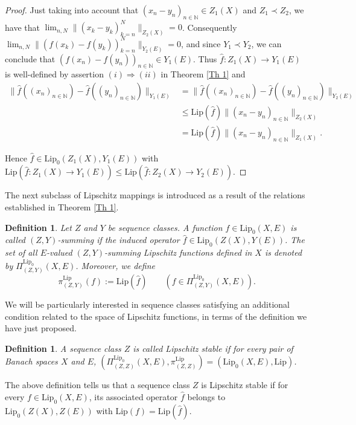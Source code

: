 \documentclass[12pt]{amsart}
\newtheorem{definition}[theorem]{Definition}
\def\N{\mathbb{N}}
\def\Lip{\mathrm{Lip}_0}
\def\Lipnorm{\mathrm{Lip}}
\begin{document}
\begin{proof}
	Just taking into account that $(x_n-y_n)_{n\in\N} \in Z_1(X)$ and $Z_1 \prec Z_2$, we have that $\lim_{n,N}\|(x_k-y_k)_{k=n}^N\|_{Z_2(X)} = 0$. Consequently $\lim_{n,N}\|(f(x_k)-f(y_k))_{k=n}^N\|_{Y_2(E)}=0$, and since $Y_1 \prec Y_2$, we can conclude that $(f(x_n)-f(y_n))_{n\in\N} \in Y_1(E)$. Thus $\hat{f}:Z_1(X)\to Y_1(E)$ is well-defined by assertion $(i) \Rightarrow (ii)$ in Theorem \ref{Th 1} and
	\begin{align*}
		\|\hat{f}((x_n)_{n\in\N})-\hat{f}((y_n)_{n\in\N})\|_{Y_1(E)} &= \|\hat{f}((x_n)_{n\in\N})-\hat{f}((y_n)_{n\in\N})\|_{Y_2(E)}\\
		&\leq \Lipnorm(\hat{f})\|(x_n-y_n)_{n\in\N}\|_{Z_2(X)}\\
		&= \Lipnorm(\hat{f})\|(x_n-y_n)_{n\in\N}\|_{Z_1(X)}.
	\end{align*}

	Hence $\hat{f} \in \Lip(Z_1(X),Y_1(E))$ with $\Lipnorm(\hat{f}:Z_1(X)\to Y_1(E)) \leq \Lipnorm(\hat{f}:Z_2(X)\to Y_2(E))$.
\end{proof}

The next subclass of Lipschitz mappings is introduced as a result of the relations established in Theorem \ref{Th 1}.

\begin{definition}\label{Def 3}
	Let $Z$ and $Y$ be sequence classes. A function $f\in\Lip(X,E)$ is called $(Z,Y)$-summing if the induced operator $\hat{f} \in \Lip(Z(X),Y(E))$. The set of all $E$-valued $(Z,Y)$-summing Lipschitz functions defined in $X$ is denoted by $\Pi_{(Z,Y)}^{\Lip}(X,E)$. Moreover, we define
	$$
	\pi_{(Z,Y)}^{\Lipnorm}(f) := \Lipnorm(\hat{f}) \qquad \left(f \in \Pi_{(Z,Y)}^{\Lip}(X,E)\right).
	$$
\end{definition}

We will be particularly interested in sequence classes satisfying an additional condition related to the space of Lipschitz functions, in terms of the definition we have just proposed.

\begin{definition}\label{Def 4}
	A sequence class $Z$ is called Lipschitz stable if for every pair of Banach spaces $X$ and $E$, $(\Pi_{(Z,Z)}^{\Lip}(X,E),\pi_{(Z,Z)}^{\Lipnorm}) = (\Lip(X,E),\Lipnorm)$.
\end{definition}

The above definition tells us that a sequence class $Z$ is Lipschitz stable if for every $f\in\Lip(X,E)$, its associated operator $\hat{f}$ belongs to $\Lip(Z(X),Z(E))$ with $\Lipnorm(f)=\Lipnorm(\hat{f})$.
\end{document}
